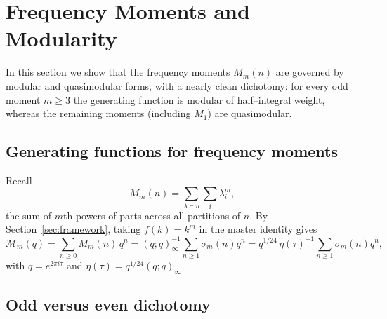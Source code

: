 \documentclass[11pt]{article}
\theoremstyle{definition}
\theoremstyle{remark}
\begin{document}
\section{Frequency Moments and Modularity}\label{sec:moments}

In this section we show that the frequency moments $M_m(n)$ are governed by modular and quasimodular forms, with a nearly clean dichotomy: for every odd moment $m\ge3$ the generating function is modular of half--integral weight, whereas the remaining moments (including $M_1$) are quasimodular.


\subsection{Generating functions for frequency moments}

Recall
\[
M_m(n)=\sum_{\lambda\vdash n}\sum_i \lambda_i^m,
\]
the sum of $m$th powers of parts across all partitions of $n$. By
Section~\ref{sec:framework}, taking $f(k)=k^m$ in the master identity gives
\[
\mathcal{M}_m(q)=\sum_{n\ge0} M_m(n)\,q^n
= (q;q)_\infty^{-1}\sum_{n\ge1}\sigma_m(n)q^n
= q^{1/24}\,\eta(\tau)^{-1}\sum_{n\ge1}\sigma_m(n)q^n,
\]
with $q=e^{2\pi i\tau}$ and $\eta(\tau)=q^{1/24}(q;q)_\infty$.

\subsection{Odd versus even dichotomy}
\end{document}
